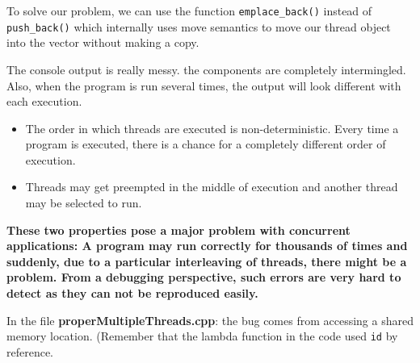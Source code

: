 \documentclass[11pt, a4paper]{article}
\begin{document}
To solve our problem, we can use the function \texttt{emplace\_back()} instead of \texttt{push\_back()} which internally uses move semantics to move our thread object into the vector without making a copy. 

The console output is really messy. the components are completely intermingled. Also, when the program is run several times, the output will look different with each execution.


\begin{itemize}
	\item The order in which threads are executed is non-deterministic. Every time a program is executed, there is a chance for a completely different order of execution.
	\item Threads may get preempted in the middle of execution and another thread may be selected to run.
\end{itemize}


\textbf{These two properties pose a major problem with concurrent applications: A program may run correctly for thousands of times and suddenly, due to a particular interleaving of threads, there might be a problem. From a debugging perspective, such errors are very hard to detect as they can not be reproduced easily.}





In the file \textbf{properMultipleThreads.cpp}: the bug comes from accessing a shared memory location. (Remember that the lambda function in the code used \texttt{id}  by reference. 
\end{document}
